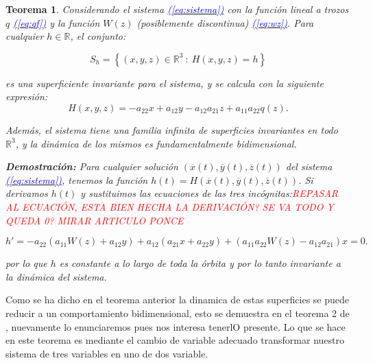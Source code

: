 \documentclass[12pt,a4paper]{report} %
\newtheorem{theorem}{Teorema}[chapter]
\newcommand{\eref}[1]{\hyperref[#1]{\textcolor{blue}{\textit{(\ref*{#1})}}}}
\begin{document}
	\begin{theorem}
		\label{teorema1}
		Considerando el sistema \eref{eq:sistema} con la función lineal a trozos $q$ \eref{eq:qf} y la función $W(z)$ (posiblemente discontinua) \eref{eq:wz}. Para cualquier $h \in \mathbb{R}$, el conjunto:
		
		\begin{equation}
			\label{eq:sh}
			S_h=\left\{(x,y,z)\in \mathbb{R}^3\: : \: H(x,y,z)=h \right\}
		\end{equation}\smallskip
		
		\noindent es una superficiente invariante para el sistema, y se calcula con la siguiente expresión:
		\begin{equation}
			\label{eq:hecuation}
			H(x,y,z)=-a_{22}x+a_{12}y-a_{12}a_{21}z+a_{11}a_{22}q(z).
		\end{equation}\smallskip
		
		\noindent Además, el sistema tiene una familia infinita de superficies invariantes en todo $\mathbb{R}^3$, y la dinámica de los mismos es fundamentalmente bidimensional.
		
		\vspace{0.5cm}\noindent \textbf{Demostración:} Para cualquier solución $(\overline{x}(t),\overline{y}(t),\overline{z}(t))$ del sistema \eref{eq:sistema}, tenemos la función $h(t)=H(\overline{x}(t),\overline{y}(t),\overline{z}(t))$. Si derivamos $h(t)$ y sustituimos las ecuaciones de las tres incógnitas:\textit{\textcolor{red}{REPASAR AL ECUACIÓN, ESTA BIEN HECHA LA DERIVACIÓN? SE VA TODO Y QUEDA 0? MIRAR ARTICULO PONCE}}
		
		\begin{equation}
				h'=-a_{22}(a_{11}W(z)+a_{12}y)+a_{12}(a_{21}x+a_{22}y)+(a_{11}a_{22}W(z)-a_{12}a_{21})x=0.
		\end{equation}\smallskip

		\noindent por lo que $h$ es constante a lo largo de toda la órbita y por lo tanto invariante a la dinámica del sistema.
	\end{theorem}
	
	Como se ha dicho en el teorema anterior la dinamica de estas superficies se puede reducir a un comportamiento bidimensional, esto se demuestra en el teorema 2 de \cite{ponce}, nuevamente lo enunciaremos pues nos interesa tenerlO presente. Lo que se hace en este teorema es mediante el cambio de variable adecuado transformar nuestro sistema de tres variables en uno de dos variable.
	
	\newpage
	
\end{document}

